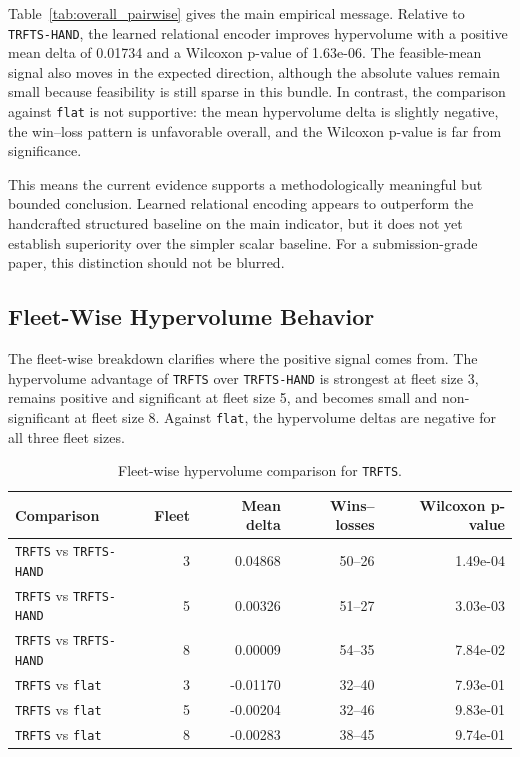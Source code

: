 \documentclass[a4paper,fleqn]{cas-dc}
\begin{document}
Table~\ref{tab:overall_pairwise} gives the main empirical message. Relative to \texttt{TRFTS-HAND}, the learned relational encoder improves hypervolume with a positive mean delta of 0.01734 and a Wilcoxon p-value of 1.63e-06. The feasible-mean signal also moves in the expected direction, although the absolute values remain small because feasibility is still sparse in this bundle. In contrast, the comparison against \texttt{flat} is not supportive: the mean hypervolume delta is slightly negative, the win--loss pattern is unfavorable overall, and the Wilcoxon p-value is far from significance.

This means the current evidence supports a methodologically meaningful but bounded conclusion. Learned relational encoding appears to outperform the handcrafted structured baseline on the main indicator, but it does not yet establish superiority over the simpler scalar baseline. For a submission-grade paper, this distinction should not be blurred.

\subsection{Fleet-Wise Hypervolume Behavior}

The fleet-wise breakdown clarifies where the positive signal comes from. The hypervolume advantage of \texttt{TRFTS} over \texttt{TRFTS-HAND} is strongest at fleet size 3, remains positive and significant at fleet size 5, and becomes small and non-significant at fleet size 8. Against \texttt{flat}, the hypervolume deltas are negative for all three fleet sizes.

\begin{table}[t]
\centering
\small
\caption{Fleet-wise hypervolume comparison for \texttt{TRFTS}.}
\label{tab:fleetwise_hv}
\begin{tabular}{lrrrr}
\toprule
Comparison & Fleet & Mean delta & Wins--losses & Wilcoxon p-value \\
\midrule
\texttt{TRFTS} vs \texttt{TRFTS-HAND} & 3 & 0.04868 & 50--26 & 1.49e-04 \\
\texttt{TRFTS} vs \texttt{TRFTS-HAND} & 5 & 0.00326 & 51--27 & 3.03e-03 \\
\texttt{TRFTS} vs \texttt{TRFTS-HAND} & 8 & 0.00009 & 54--35 & 7.84e-02 \\
\midrule
\texttt{TRFTS} vs \texttt{flat} & 3 & -0.01170 & 32--40 & 7.93e-01 \\
\texttt{TRFTS} vs \texttt{flat} & 5 & -0.00204 & 32--46 & 9.83e-01 \\
\texttt{TRFTS} vs \texttt{flat} & 8 & -0.00283 & 38--45 & 9.74e-01 \\
\bottomrule
\end{tabular}
\end{table}
\end{document}
